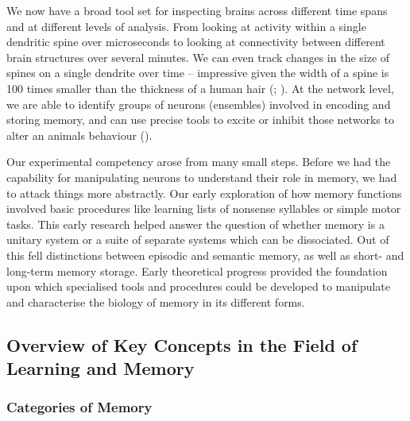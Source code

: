 \documentclass[
  jou,
  floatsintext,
  longtable,
  nolmodern,
  notxfonts,
  notimes,
  donotrepeattitle,
  colorlinks=true,linkcolor=blue,citecolor=blue,urlcolor=blue]{apa7}
\begin{document}
We now have a broad tool set for inspecting brains across different time
spans and at different levels of analysis. From looking at activity
within a single dendritic spine over microseconds to looking at
connectivity between different brain structures over several minutes. We
can even track changes in the size of spines on a single dendrite over
time -- impressive given the width of a spine is 100 times smaller than
the thickness of a human hair
(;
). At the network
level, we are able to identify groups of neurons (ensembles) involved in
encoding and storing memory, and can use precise tools to excite or
inhibit those networks to alter an animals behaviour
().

Our experimental competency arose from many small steps. Before we had
the capability for manipulating neurons to understand their role in
memory, we had to attack things more abstractly. Our early exploration
of how memory functions involved basic procedures like learning lists of
nonsense syllables or simple motor tasks. This early research helped
answer the question of whether memory is a unitary system or a suite of
separate systems which can be dissociated. Out of this fell distinctions
between episodic and semantic memory, as well as short- and long-term
memory storage. Early theoretical progress provided the foundation upon
which specialised tools and procedures could be developed to manipulate
and characterise the biology of memory in its different forms.

\subsection{Overview of Key Concepts in the Field of Learning and
Memory}\label{overview-of-key-concepts-in-the-field-of-learning-and-memory}

\subsubsection{Categories of Memory}\label{categories-of-memory}
\end{document}
